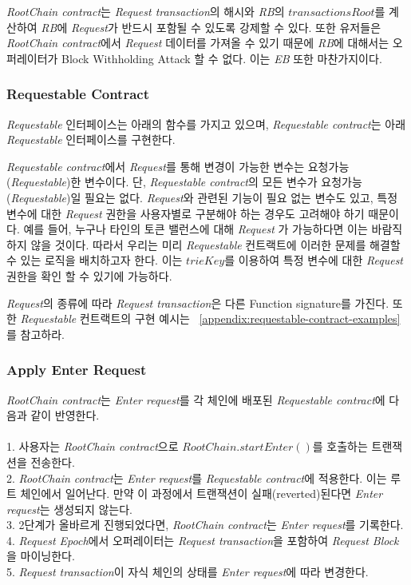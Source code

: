 \documentclass[letterpaper, 11pt]{article}
\begin{document}
\begin{CJK}{UTF8}{mj}
\begin{CJK}{UTF8}{mj}
\emph{RootChain contract}는 \emph{Request transaction}의 해시와 \emph{RB}의 $transactionsRoot$를 계산하여 \emph{RB}에 \emph{Request}가 반드시 포함될 수 있도록 강제할 수 있다. 또한 유저들은 \emph{RootChain contract}에서 \emph{Request} 데이터를 가져올 수 있기 때문에 \emph{RB}에 대해서는 오퍼레이터가 Block Withholding Attack 할 수 없다. 이는 \emph{EB} 또한 마찬가지이다.
\end{CJK}

\subsubsection{Requestable Contract}
\begin{CJK}{UTF8}{mj}
\emph{Requestable} 인터페이스는 아래의 함수를 가지고 있으며, \emph{Requestable contract}는 아래 \emph{Requestable} 인터페이스를 구현한다.



\emph{Requestable contract}에서 \emph{Request}를 통해 변경이 가능한 변수는 요청가능(\emph{Requestable})한 변수이다. 단, \emph{Requestable contract}의 모든 변수가 요청가능(\emph{Requestable})일 필요는 없다. \emph{Request}와 관련된 기능이 필요 없는 변수도 있고, 특정 변수에 대한 \emph{Request} 권한을 사용자별로 구분해야 하는 경우도 고려해야 하기 때문이다. 예를 들어, 누구나 타인의 토큰 밸런스에 대해 \emph{Request} 가 가능하다면 이는 바람직하지 않을 것이다. 따라서 우리는 미리 \emph{Requestable} 컨트랙트에 이러한 문제를 해결할 수 있는 로직을 배치하고자 한다. 이는 $trieKey$를 이용하여 특정 변수에 대한 \emph{Request} 권한을 확인 할 수 있기에 가능하다.

\emph{Request}의 종류에 따라 \emph{Request transaction}은 다른 Function signature를 가진다. 또한 \emph{Requestable} 컨트랙트의 구현 예시는 ~\ref{appendix:requestable-contract-examples}를 참고하라.
\end{CJK}

\subsubsection{Apply Enter Request}
\begin{CJK}{UTF8}{mj}
\emph{RootChain contract}는 \emph{Enter request}를 각 체인에 배포된 \emph{Requestable contract}에 다음과 같이 반영한다.\\
\\
1. 사용자는 \emph{RootChain contract}으로 $RootChain.startEnter()$를 호출하는 트랜잭션을 전송한다. \\
2. \emph{RootChain contract}는 \emph{Enter request}를 \emph{Requestable contract}에 적용한다. 이는 루트 체인에서 일어난다. 만약 이 과정에서 트랜잭션이 실패(reverted)된다면 \emph{Enter request}는 생성되지 않는다.\\
3. 2단계가 올바르게 진행되었다면, \emph{RootChain contract}는 \emph{Enter request}를 기록한다.\\
4. \emph{Request Epoch}에서 오퍼레이터는 \emph{Request transaction}을 포함하여 \emph{Request Block}을 마이닝한다.\\
5. \emph{Request transaction}이 자식 체인의 상태를 \emph{Enter request}에 따라 변경한다.


\end{CJK}
\end{CJK}
\end{document}
